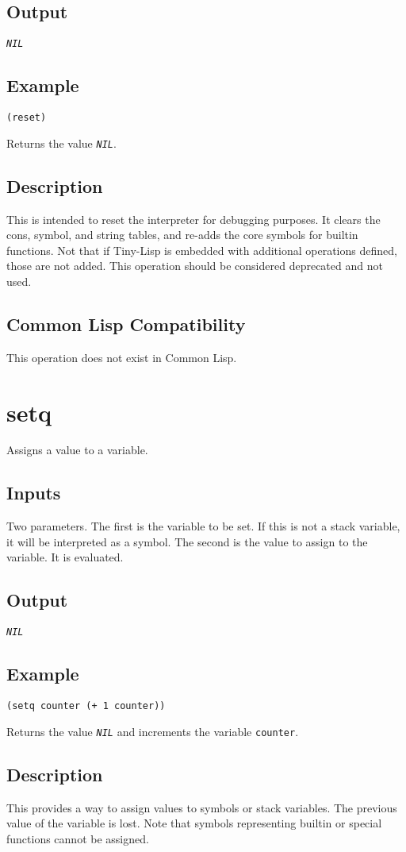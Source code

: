 \documentclass[10pt, openany]{book}
\newcommand{\constant}[1]{\emph{\texttt{#1}}}
\newcommand{\keyword}[1]{\texttt{#1}}
\newcommand{\tl}{Tiny-Lisp}
\newcommand{\cl}{Common Lisp}
\begin{document}
\subsection{Output}
\constant{NIL}
\subsection{Example}
\begin{lstlisting}
(reset)
\end{lstlisting}
Returns the value \constant{NIL}.
\subsection{Description}
This is intended to reset the interpreter for debugging purposes.  It clears the cons, symbol, and string tables, and re-adds the core symbols for builtin functions.  Not that if \tl{} is embedded with additional operations defined, those are not added.  This operation should be considered deprecated and not used.
\subsection{Common Lisp Compatibility}
This operation does not exist in \cl.

\section{setq}
Assigns a value to a variable.
\subsection{Inputs}
Two parameters.  The first is the variable to be set.  If this is not a stack variable, it will be interpreted as a symbol.  The second is the value to assign to the variable.  It is evaluated.
\subsection{Output}
\constant{NIL}
\subsection{Example}
\begin{lstlisting}
(setq counter (+ 1 counter))
\end{lstlisting}
Returns the value \constant{NIL} and increments the variable \keyword{counter}.
\subsection{Description}
This provides a way to assign values to symbols or stack variables.  The previous value of the variable is lost.  Note that symbols representing builtin or special functions cannot be assigned.
\end{document}
